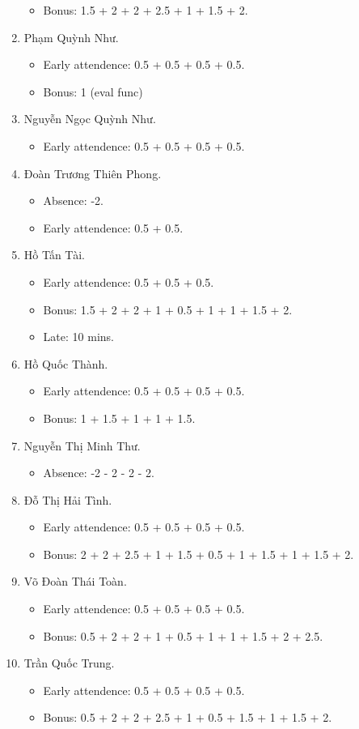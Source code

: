 \documentclass{article}
\begin{document}
\begin{enumerate}
\begin{itemize}
		\item Bonus: 1.5 + 2 + 2 + 2.5 + 1 + 1.5 + 2.
	\end{itemize}
	\item {\sc Phạm Quỳnh Như.}
	\begin{itemize}
		\item Early attendence: 0.5 + 0.5 + 0.5 + 0.5.
		\item Bonus: 1 (eval func)
	\end{itemize}
	\item {\sc Nguyễn Ngọc Quỳnh Như.}
	\begin{itemize}
		\item Early attendence: 0.5 + 0.5 + 0.5 + 0.5.
	\end{itemize}
	\item {\sc Đoàn Trương Thiên Phong.}
	\begin{itemize}
		\item Absence: -2.
		\item Early attendence: 0.5 + 0.5.
	\end{itemize}
	\item {\sc Hồ Tấn Tài.}
	\begin{itemize}
		\item Early attendence: 0.5 + 0.5 + 0.5.
		\item Bonus: 1.5 + 2 + 2 + 1 + 0.5 + 1 + 1 + 1.5 + 2.
		\item Late: 10 mins.
	\end{itemize}
	\item {\sc Hồ Quốc Thành.}
	\begin{itemize}
		\item Early attendence: 0.5 + 0.5 + 0.5 + 0.5.
		\item Bonus: 1 + 1.5 + 1 + 1 + 1.5.
	\end{itemize}
	\item {\sc Nguyễn Thị Minh Thư.}
	\begin{itemize}
		\item Absence: -2 - 2 - 2 - 2.
	\end{itemize}
	\item {\sc Đỗ Thị Hải Tình.}
	\begin{itemize}
		\item Early attendence: 0.5 + 0.5 + 0.5 + 0.5.
		\item Bonus: 2 + 2 + 2.5 + 1 + 1.5 + 0.5 + 1 + 1.5 + 1 + 1.5 + 2.
	\end{itemize}
	\item {\sc Võ Đoàn Thái Toàn.}
	\begin{itemize}
		\item Early attendence: 0.5 + 0.5 + 0.5 + 0.5.
		\item Bonus: 0.5 + 2 + 2 + 1 + 0.5 + 1 + 1 + 1.5 + 2 + 2.5.
	\end{itemize}
	\item {\sc Trần Quốc Trung.}
	\begin{itemize}
		\item Early attendence: 0.5 + 0.5 + 0.5 + 0.5.
		\item Bonus: 0.5 + 2 + 2 + 2.5 + 1 + 0.5 + 1.5 + 1 + 1.5 + 2.
	\end{itemize}
\end{enumerate}
\end{document}

